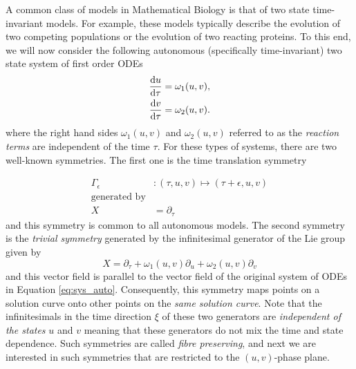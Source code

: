 A common class of models in Mathematical Biology is that of two state time-invariant models. For example, these models typically describe the evolution of two competing populations or the evolution of two reacting proteins. To this end, we will now consider the following autonomous (specifically time-invariant) two state system of first order ODEs
\begin{equation}
  \begin{split}
    \dv{u}{\tau}&=\omega_1(u,v),\\
    \dv{v}{\tau}&=\omega_2(u,v).
  \end{split}
  \label{eq:sys_auto}
\end{equation}
where the right hand sides $\omega_1(u,v)$ and $\omega_2(u,v)$ referred to as the \textit{reaction terms} are independent of the time $\tau$. For these types of systems, there are two well-known symmetries. The first one is the time translation symmetry 

\begin{equation}
  \begin{split}
    \Gamma_{\epsilon}&:(\tau,u,v)\mapsto(\tau+\epsilon,u,v)\\
   \textrm{generated by}&\\
    X&=\partial_\tau
  \end{split}
  \label{eq:time_trans}
\end{equation}
and this symmetry is common to all autonomous models. The second symmetry is the \textit{trivial symmetry} generated by the infinitesimal generator of the Lie group given by
\begin{equation}
X=\partial_\tau+\omega_1(u,v)\partial_u+\omega_2(u,v)\partial_v
  \label{eq:trivial}
\end{equation}
and this vector field is parallel to the vector field of the original system of ODEs in Equation \eqref{eq:sys_auto}. Consequently, this symmetry maps points on a solution curve onto other points on the \textit{same solution curve}. Note that the infinitesimals in the time direction $\xi$ of these two generators are \textit{independent of the states} $u$ and $v$ meaning that these generators do not mix the time and state dependence. Such symmetries are called \textit{fibre preserving}, and next we are interested in such symmetries that are restricted to the $(u,v)$-phase plane.\\

